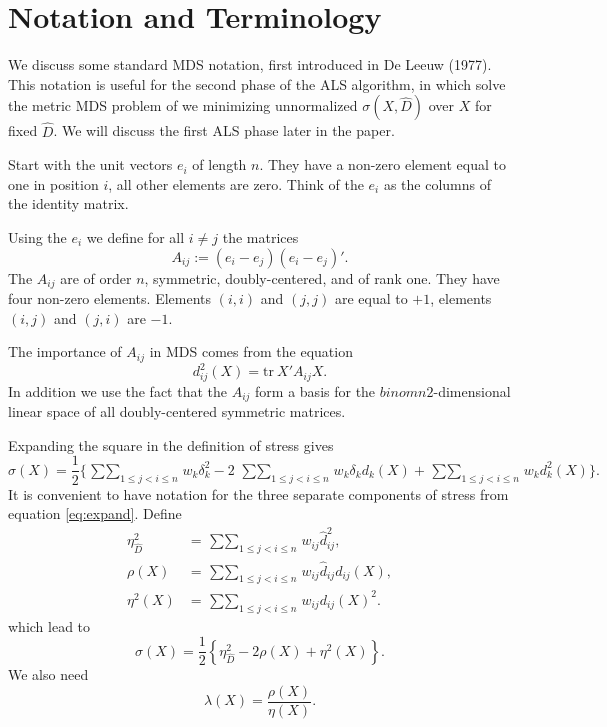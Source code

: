\documentclass[
  12pt,
]{article}
\newcommand{\jis}{\mathop{\sum\sum}_{1\leq j<i\leq n}}
\begin{document}
\section*{Notation and Terminology}\label{notation-and-terminology}

We discuss some standard MDS notation, first introduced in De Leeuw (1977). This
notation is useful for the second phase of the ALS algorithm, in which solve the metric MDS problem of we minimizing unnormalized
\(\sigma(X,\hat D)\) over \(X\) for fixed \(\hat D\). We will discuss the first ALS phase
later in the paper.

Start with the unit vectors \(e_i\) of length \(n\). They have a non-zero
element equal to one in position \(i\), all other elements are zero. Think
of the \(e_i\) as the columns of the identity matrix.

Using the \(e_i\) we define for all \(i\not= j\) the matrices
\begin{equation}
A_{ij}:=(e_i-e_j)(e_i-e_j)'.
\end{equation} The \(A_{ij}\) are of order \(n\), symmetric, doubly-centered, and of rank one. They have four non-zero elements. Elements
\((i,i)\) and \((j,j)\) are equal to \(+1\), elements \((i,j)\) and \((j,i)\) are
\(-1\).

The importance of \(A_{ij}\) in MDS comes from the equation
\begin{equation}
d_{ij}^2(X)=\text{tr}\ X'A_{ij}X.
\label{eq:dfroma}
\end{equation}
In addition we use the fact that the \(A_{ij}\) form a basis for the \(binom{n}{2}\)-dimensional linear space of all doubly-centered
symmetric matrices.

Expanding the square in the definition of stress gives
\begin{equation}
\sigma(X)=\frac12\{\jis w_k\delta_k^2-2\ \jis w_k\delta_kd_k(X)+\jis w_kd_k^2(X)\}.
\label{eq:expand}
\end{equation}
It is convenient to have notation for the three separate
components of stress from equation \eqref{eq:expand}. Define
\begin{align}
\eta_{\hat D}^2&=\jis w_{ij}\hat d_{ij}^2,\label{eq:condef}\\
\rho(X)&=\jis w_{ij}\hat d_{ij}d_{ij}(X),\label{eq:rhodef}\\
\eta^2(X)&=\jis w_{ij}d_{ij}(X)^2.\label{eq:etadef}
\end{align} which lead to
\begin{equation}
\sigma(X)=\frac12\left\{\eta_{\hat D}^2-2\rho(X)+\eta^2(X)\right\}.
\label{eq:stressshort}
\end{equation}
We also need
\begin{equation}
\lambda(X)=\frac{\rho(X)}{\eta(X)}.
\label{eq:lambdadef}
\end{equation}
\end{document}
